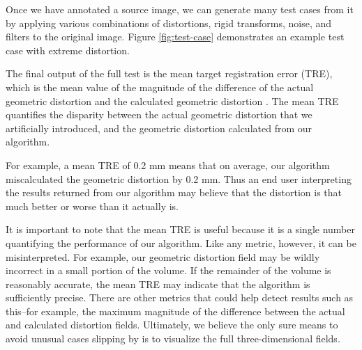 \documentclass[12pt]{article}
\begin{document}
Once we have annotated a source image, we can generate many test cases from it by applying various combinations of distortions, rigid transforms, noise, and filters to the original image.  Figure \ref{fig:test-case} demonstrates an example test case with extreme distortion.

The final output of the full test is the mean target registration error (TRE), which is the mean value of the magnitude of the difference of the actual geometric distortion and the calculated geometric distortion \cite[page R37]{hill2001}.  The mean TRE quantifies the disparity between the actual geometric distortion that we artificially introduced, and the geometric distortion calculated from our algorithm.

For example, a mean TRE of 0.2 mm means that on average, our algorithm miscalculated the geometric distortion by 0.2 mm.  Thus an end user interpreting the results returned from our algorithm may believe that the distortion is that much better or worse than it actually is.

It is important to note that the mean TRE is useful because it is a single number quantifying the performance of our algorithm.  Like any metric, however, it can be misinterpreted.  For example, our geometric distortion field may be wildly incorrect in a small portion of the volume.  If the remainder of the volume is reasonably accurate, the mean TRE may indicate that the algorithm is sufficiently precise.  There are other metrics that could help detect results such as this--for example, the maximum magnitude of the difference between the actual and calculated distortion fields.  Ultimately, we believe the only sure means to avoid unusual cases slipping by is to visualize the full three-dimensional fields.
\end{document}
